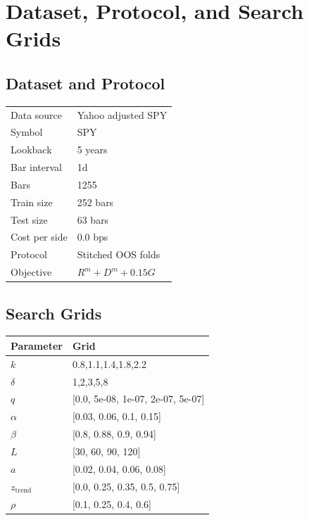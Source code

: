 \documentclass[10pt]{article}
\begin{document}
\section*{Dataset, Protocol, and Search Grids}
\noindent
\begin{minipage}[t]{0.47\textwidth}
\subsection*{Dataset and Protocol}
\small
\begin{tabular}{ll}
\toprule
Data source & Yahoo adjusted SPY \\
Symbol & SPY \\
Lookback & 5 years \\
Bar interval & 1d \\
Bars & 1255 \\
Train size & 252 bars \\
Test size & 63 bars \\
Cost per side & 0.0 bps \\
Protocol & Stitched OOS folds \\
Objective & $R^m + D^m + 0.15G$ \\
\bottomrule
\end{tabular}
\end{minipage}
\hfill
\begin{minipage}[t]{0.49\textwidth}
\subsection*{Search Grids}
\small
\begin{tabular}{ll}
\toprule
Parameter & Grid \\
\midrule
$k$ & 0.8,1.1,1.4,1.8,2.2 \\
$\delta$ & 1,2,3,5,8 \\
$q$ & [0.0, 5e-08, 1e-07, 2e-07, 5e-07] \\
$\alpha$ & [0.03, 0.06, 0.1, 0.15] \\
$\beta$ & [0.8, 0.88, 0.9, 0.94] \\
$L$ & [30, 60, 90, 120] \\
$a$ & [0.02, 0.04, 0.06, 0.08] \\
$z_{\mathrm{trend}}$ & [0.0, 0.25, 0.35, 0.5, 0.75] \\
$\rho$ & [0.1, 0.25, 0.4, 0.6] \\
\bottomrule
\end{tabular}
\end{minipage}
\normalsize
\end{document}
